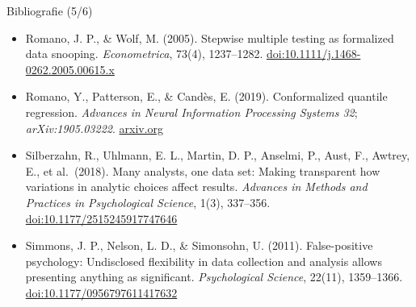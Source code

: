 \begin{frame}{Bibliografie (5/6)}
\begin{itemize}
    \item Romano, J. P., \& Wolf, M. (2005). Stepwise multiple testing as formalized data snooping. \textit{Econometrica}, 73(4), 1237--1282. \href{https://doi.org/10.1111/j.1468-0262.2005.00615.x}{doi:10.1111/j.1468-0262.2005.00615.x}
    \item Romano, Y., Patterson, E., \& Candès, E. (2019). Conformalized quantile regression. \textit{Advances in Neural Information Processing Systems 32}; \textit{arXiv:1905.03222}. \href{https://arxiv.org/abs/1905.03222}{arxiv.org}
    \item Silberzahn, R., Uhlmann, E. L., Martin, D. P., Anselmi, P., Aust, F., Awtrey, E., et al.\ (2018). Many analysts, one data set: Making transparent how variations in analytic choices affect results. \textit{Advances in Methods and Practices in Psychological Science}, 1(3), 337--356. \href{https://doi.org/10.1177/2515245917747646}{doi:10.1177/2515245917747646}
    \item Simmons, J. P., Nelson, L. D., \& Simonsohn, U. (2011). False-positive psychology: Undisclosed flexibility in data collection and analysis allows presenting anything as significant. \textit{Psychological Science}, 22(11), 1359--1366. \href{https://doi.org/10.1177/0956797611417632}{doi:10.1177/0956797611417632}
\end{itemize}
\end{frame}

